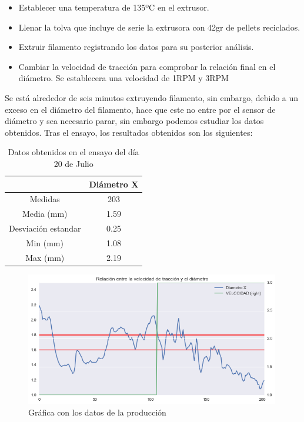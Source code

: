 \begin{itemize}
    \item{Establecer una temperatura de 135ºC en el extrusor.}
    \item{Llenar la tolva que incluye de serie la extrusora con 42gr de pellets reciclados.}
    \item{Extruir filamento registrando los datos para su posterior análisis.}
    \item{Cambiar la velocidad de tracción para comprobar la relación final en el diámetro. Se establecera una velocidad de 1RPM y 3RPM}
\end{itemize}

Se está alrededor de seis minutos extruyendo filamento, sin embargo, debido a un exceso en el diámetro del filamento, hace que este no entre por el sensor de diámetro y sea necesario parar, sin embargo podemos estudiar los datos obtenidos.
Tras el ensayo, los resultados obtenidos son los siguientes:


\begin{table}[H]
    \centering
    \begin{tabular}{cc}
               & Diámetro X \\ \hline
    Medidas    & 203        \\
    Media (mm) & 1.59       \\
    Desviación estandar & 0.25\\
    Min (mm)   & 1.08       \\
    Max (mm)   & 2.19      
    \end{tabular}
    \caption{Datos obtenidos en el ensayo del día 20 de Julio}
    \label{tab:20007105-dat}
\end{table}


\begin{figure}[H]
    \centering
    \includegraphics[width=0.99\textwidth]{images/producciones/20072015/graficas.png}
    \caption{Gráfica con los datos de la producción}
    \label{fig:2007105-graf}
\end{figure}

